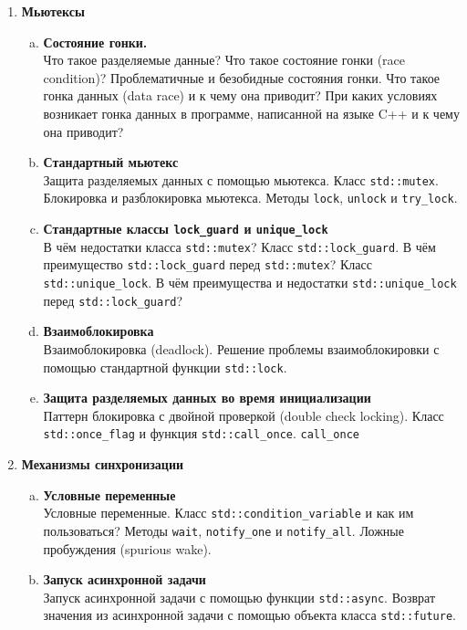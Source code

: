 \documentclass{article}
\begin{document}
\begin{enumerate}
\item \textbf{Мьютексы}
\begin{enumerate}[a.]
\item \textbf{Состояние гонки.}\\
Что такое разделяемые данные? Что такое состояние гонки (race condition)? Проблематичные и безобидные состояния гонки. Что такое гонка данных (data race) и к чему она приводит? При каких условиях возникает гонка данных в программе, написанной на языке C++ и к чему она приводит?

\item \textbf{Стандартный мьютекс}\\
Защита разделяемых данных с помощью мьютекса. Класс \texttt{std::mutex}. Блокировка и разблокировка мьютекса. Методы \texttt{lock}, \texttt{unlock} и \texttt{try\_lock}.

\item \textbf{Стандартные классы \texttt{lock\_guard} и \texttt{unique\_lock}}\\
В чём недостатки класса \texttt{std::mutex}? Класс \texttt{std::lock\_guard}.  
В чём преимущество \texttt{std::lock\_guard} перед \texttt{std::mutex}? Класс \texttt{std::unique\_lock}. В чём преимущества и недостатки \texttt{std::unique\_lock} перед \texttt{std::lock\_guard}? 

\item \textbf{Взаимоблокировка}\\
Взаимоблокировка (deadlock). Решение проблемы взаимоблокировки с помощью стандартной функции \texttt{std::lock}.

\item \textbf{Защита разделяемых данных во время инициализации}\\
Паттерн блокировка с двойной проверкой (double check locking). Класс \texttt{std::once\_flag} и функция \texttt{std::call\_once}.
\texttt{call\_once}
\end{enumerate}



\item \textbf{Механизмы синхронизации}
\begin{enumerate}[a.]
\item \textbf{Условные переменные}\\
Условные переменные. Класс \texttt{std::condition\_variable} и как им пользоваться? Методы \texttt{wait}, \texttt{notify\_one} и \texttt{notify\_all}. Ложные пробуждения (spurious wake).

\item \textbf{Запуск асинхронной задачи}\\
Запуск асинхронной задачи с помощью функции \texttt{std::async}. Возврат значения из асинхронной задачи с помощью объекта класса \texttt{std::future}.


\end{enumerate}
\end{enumerate}
\end{document}

